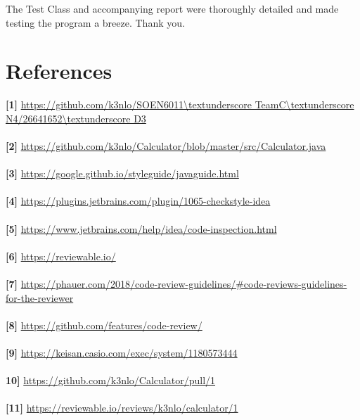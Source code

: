 \documentclass[12pt]{extarticle}
\newcommand{\<}{\langle}
\renewcommand{\>}{\rangle}
\theoremstyle{definition}
\begin{document}
\noindent The Test Class and accompanying report were thoroughly detailed and made testing the program a breeze. Thank you.








\pagebreak

\section*{References}
\textbf{[1]} \url{https://github.com/k3nlo/SOEN6011\textunderscore TeamC\textunderscore N4/26641652\textunderscore D3}\\ \\
\textbf{[2]} \url{https://github.com/k3nlo/Calculator/blob/master/src/Calculator.java}\\ \\
\textbf{[3]} \url{https://google.github.io/styleguide/javaguide.html}\\ \\
\textbf{[4]} \url{https://plugins.jetbrains.com/plugin/1065-checkstyle-idea}\\ \\
\textbf{[5]} \url{https://www.jetbrains.com/help/idea/code-inspection.html}\\ \\
\textbf{[6]} \url{https://reviewable.io/}\\ \\
\textbf{[7]} \url{https://phauer.com/2018/code-review-guidelines/#code-reviews-guidelines-for-the-reviewer}\\ \\
\textbf{[8]} \url{https://github.com/features/code-review/}\\ \\
\textbf{[9]} \url{https://keisan.casio.com/exec/system/1180573444}\\ \\
\textbf{10]} \url{https://github.com/k3nlo/Calculator/pull/1}\\ \\
\textbf{[11]} \url{https://reviewable.io/reviews/k3nlo/calculator/1}\\ \\
\end{document}
